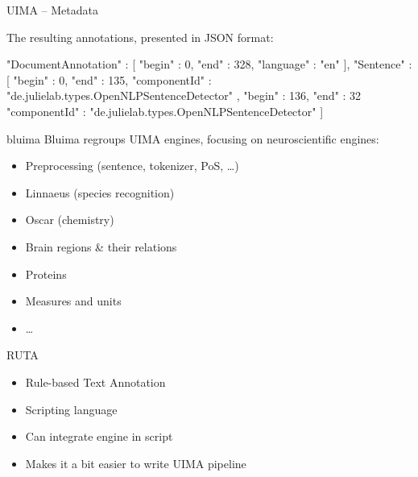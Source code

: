 \documentclass[10pt, compress, xcolor={usenames,dvipsnames}]{beamer}
\newcommand{\SmallArrow}{\ding{228}}
\renewcommand{\emph}[1]{\alert{#1}}
\begin{document}

\begin{frame}[fragile]{UIMA -- Metadata}

  The resulting annotations, presented in JSON format:

  \vspace{1em}

  \begin{lstjson}
"DocumentAnnotation" : [
  { "begin" : 0,    "end" : 328,  "language" : "en" }
],
"Sentence" : [
  { "begin" : 0,    "end" : 135,
    "componentId" :
        "de.julielab.types.OpenNLPSentenceDetector" },
  { "begin" : 136,  "end" : 32
    "componentId" :
        "de.julielab.types.OpenNLPSentenceDetector" }
]
  \end{lstjson}

\end{frame}

\begin{frame}[fragile]{bluima}
  \emph{Bluima} regroups UIMA engines, focusing on neuroscientific engines:

  \begin{itemize}[label=\SmallArrow]

    \item Preprocessing (sentence, tokenizer, PoS, \ldots)

    \item Linnaeus (species recognition)

    \item Oscar (chemistry)

    \item \emph{Brain regions \& their relations}

    \item Proteins

    \item Measures and units

    \item \ldots

  \end{itemize}

\end{frame}

\begin{frame}[fragile]{RUTA}

  \begin{itemize}[label=\SmallArrow, itemsep=1em]

    \item Rule-based Text Annotation

    \item Scripting language

    \item Can \emph{integrate engine} in script

    \item Makes it a bit easier to write UIMA pipeline

  \end{itemize}

\end{frame}
\end{document}
